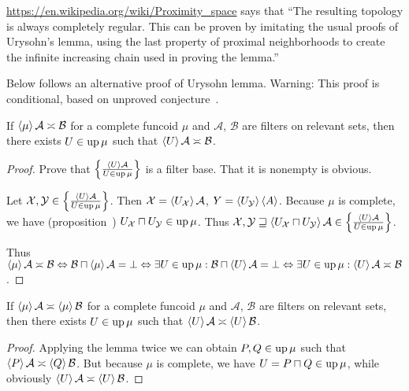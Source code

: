 \url{https://en.wikipedia.org/wiki/Proximity_space} says that
``The resulting topology is always completely regular. This can be proven by imitating the usual proofs of Urysohn's lemma, using the last property of proximal neighborhoods to create the infinite increasing chain used in proving the lemma.''

Below follows an alternative proof of Urysohn lemma. Warning: This proof is conditional,
based on unproved conjecture~.

\begin{lem}
  If $\left\langle \mu\right\rangle \mathcal{A} \asymp \mathcal{B}$ for a complete
  funcoid $\mu$ and $\mathcal{A}$, $\mathcal{B}$ are filters on relevant
  sets, then there exists $U \in \operatorname{up} \mu$ such that $\left\langle U\right\rangle \mathcal{A} \asymp \mathcal{B}$.
\end{lem}

\begin{proof}
  Prove that $\left\{ \frac{ \left\langle U\right\rangle \mathcal{A} }{
  U \in \operatorname{up} \mu }\right\}$ is a filter base. That it
  is nonempty is obvious.
  
  Let $\mathcal{X}, \mathcal{Y} \in \left\{ \frac{ \left\langle U\right\rangle \mathcal{A}
  }{ U \in \operatorname{up} \mu }\right\}$. Then
  $\mathcal{X} = \left\langle U_{\mathcal{X}}\right\rangle \mathcal{A}$, $Y = \left\langle 
  U_{\mathcal{Y}}\right\rangle \left\langle A\right\rangle$. Because $\mu$ is complete, we have
  (proposition~) $U_{\mathcal{X}} \sqcap U_{\mathcal{Y}} \in \operatorname{up}
  \mu$. Thus $\mathcal{X}, \mathcal{Y} \sqsupseteq \left\langle 
  U_{\mathcal{X}} \sqcap U_{\mathcal{Y}} \right\rangle \mathcal{A} \in \left\{ \frac{
  \left\langle U\right\rangle \mathcal{A} }{ U \in \operatorname{up} \mu }\right\}$.
  
  Thus $\left\langle \mu\right\rangle \mathcal{A} \asymp \mathcal{B}
  \Leftrightarrow \mathcal{B} \sqcap \left\langle \mu\right\rangle \mathcal{A} =
  \bot \Leftrightarrow \exists U \in \operatorname{up} \mu: \mathcal{B} \sqcap
  \left\langle U\right\rangle \mathcal{A} = \bot \Leftrightarrow \exists U \in \operatorname{up}
  \mu: \left\langle U\right\rangle \mathcal{A} \asymp \mathcal{B}$.
\end{proof}

\begin{cor}\label{disj-mu}
  If $\left\langle \mu\right\rangle \mathcal{A} \asymp \left\langle \mu\right\rangle
  \mathcal{B}$ for a complete funcoid $\mu$ and $\mathcal{A}$,
  $\mathcal{B}$ are filters on relevant sets, then there exists $U \in
  \operatorname{up} \mu$ such that $\left\langle U\right\rangle \mathcal{A} \asymp \left\langle U\right\rangle \mathcal{B}$.
\end{cor}

\begin{proof}
  Applying the lemma twice we can obtain $P, Q \in \operatorname{up} \mu$
  such that $\left\langle P\right\rangle \mathcal{A} \asymp \left\langle Q\right\rangle \mathcal{B}$. But because
  $\mu$ is complete, we have $U = P \sqcap Q \in \operatorname{up} \mu$,
  while obviously $\left\langle U\right\rangle \mathcal{A} \asymp \left\langle U\right\rangle \mathcal{B}$.
\end{proof}

